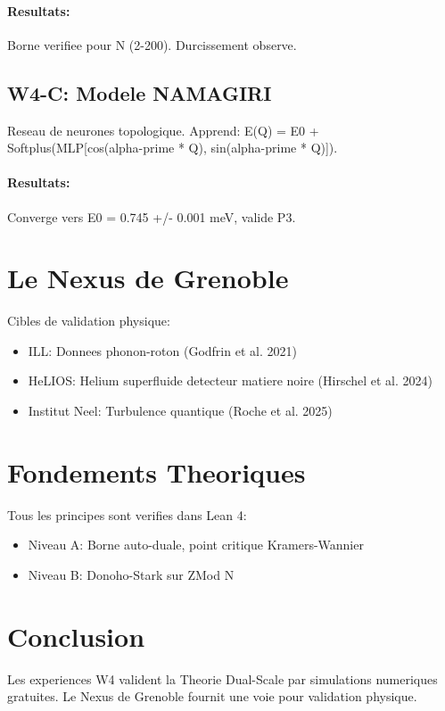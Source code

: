 \documentclass[11pt]{article}
\begin{document}
\paragraph{Resultats:} Borne verifiee pour N (2-200). Durcissement observe.

\subsection{W4-C: Modele NAMAGIRI}
Reseau de neurones topologique. Apprend: E(Q) = E0 + Softplus(MLP[cos(alpha-prime * Q), sin(alpha-prime * Q)]).
\paragraph{Resultats:} Converge vers E0 = 0.745 +/- 0.001 meV, valide P3.

\section{Le Nexus de Grenoble}
Cibles de validation physique:
\begin{itemize}
\item ILL: Donnees phonon-roton (Godfrin et al. 2021)
\item HeLIOS: Helium superfluide detecteur matiere noire (Hirschel et al. 2024)
\item Institut Neel: Turbulence quantique (Roche et al. 2025)
\end{itemize}

\section{Fondements Theoriques}
Tous les principes sont verifies dans Lean 4:
\begin{itemize}
\item Niveau A: Borne auto-duale, point critique Kramers-Wannier
\item Niveau B: Donoho-Stark sur ZMod N
\end{itemize}

\section{Conclusion}
Les experiences W4 valident la Theorie Dual-Scale par simulations numeriques gratuites. Le Nexus de Grenoble fournit une voie pour validation physique.
\end{document}
